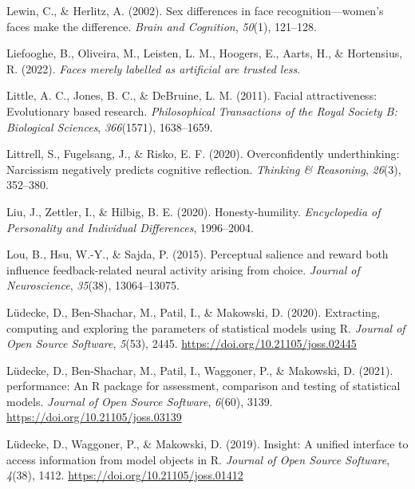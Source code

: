 \documentclass[
  man,
  floatsintext,
  longtable,
  nolmodern,
  notxfonts,
  notimes,
  colorlinks=true,linkcolor=blue,citecolor=blue,urlcolor=blue]{apa7}
\newlength{\cslhangindent}
\newenvironment{CSLReferences}[2] %
 {\begin{list}{}{%
  \setlength{\itemindent}{0pt}
  \setlength{\leftmargin}{0pt}
  \setlength{\parsep}{0pt}
  \ifodd #1
   \setlength{\leftmargin}{\cslhangindent}
   \setlength{\itemindent}{-1\cslhangindent}
  \fi
  \setlength{\itemsep}{#2\baselineskip}}}
 {\end{list}}
\begin{document}
\begin{CSLReferences}{1}{0}
Lewin, C., \& Herlitz, A. (2002). Sex differences in face
recognition---women's faces make the difference. \emph{Brain and
Cognition}, \emph{50}(1), 121--128.

Liefooghe, B., Oliveira, M., Leisten, L. M., Hoogers, E., Aarts, H., \&
Hortensius, R. (2022). \emph{Faces merely labelled as artificial are
trusted less}.

Little, A. C., Jones, B. C., \& DeBruine, L. M. (2011). Facial
attractiveness: Evolutionary based research. \emph{Philosophical
Transactions of the Royal Society B: Biological Sciences},
\emph{366}(1571), 1638--1659.

Littrell, S., Fugelsang, J., \& Risko, E. F. (2020). Overconfidently
underthinking: Narcissism negatively predicts cognitive reflection.
\emph{Thinking \& Reasoning}, \emph{26}(3), 352--380.

Liu, J., Zettler, I., \& Hilbig, B. E. (2020). Honesty-humility.
\emph{Encyclopedia of Personality and Individual Differences},
1996--2004.

Lou, B., Hsu, W.-Y., \& Sajda, P. (2015). Perceptual salience and reward
both influence feedback-related neural activity arising from choice.
\emph{Journal of Neuroscience}, \emph{35}(38), 13064--13075.

Lüdecke, D., Ben-Shachar, M., Patil, I., \& Makowski, D. (2020).
Extracting, computing and exploring the parameters of statistical models
using {R}. \emph{Journal of Open Source Software}, \emph{5}(53), 2445.
\url{https://doi.org/10.21105/joss.02445}

Lüdecke, D., Ben-Shachar, M., Patil, I., Waggoner, P., \& Makowski, D.
(2021). {performance}: An {R} package for assessment, comparison and
testing of statistical models. \emph{Journal of Open Source Software},
\emph{6}(60), 3139. \url{https://doi.org/10.21105/joss.03139}

Lüdecke, D., Waggoner, P., \& Makowski, D. (2019). Insight: A unified
interface to access information from model objects in {R}. \emph{Journal
of Open Source Software}, \emph{4}(38), 1412.
\url{https://doi.org/10.21105/joss.01412}


\end{CSLReferences}
\end{document}
